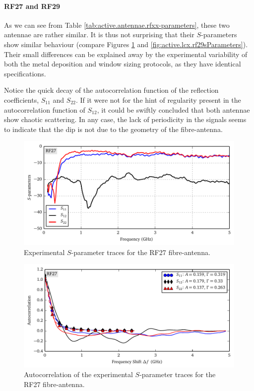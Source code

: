 \paragraph{RF27 and RF29}
As we can see from Table \ref{tab:active.antennae.rfxx-parameters}, these two antennae
are rather similar. It is thus not surprising that their $S$-parameters
show similar behaviour (compare Figures \ref{fig:active.lcx.rf27sParameters} and
\ref{fig:active.lcx.rf29sParameters}). Their small differences can be explained
away by the experimental variability of both the metal deposition and window
sizing protocols, as they have identical specifications.

Notice the quick decay of the autocorrelation function of the reflection 
coefficients, $S_{11}$ and $S_{22}$. If it were not for the hint of
regularity present in the autocorrelation function of $S_{12}$, 
it could be swiftly concluded that both antennae show chaotic scattering.
In any case, the lack of periodicity in the signals seems to indicate 
that the dip is not due to the geometry of the fibre-antenna. 

\begin{figure}
 \centering
 \includegraphics{figs/active/RF27-sParameters.pdf}
 \caption[Experimental $S$-parameter traces for the RF27 fibre-antenna]
 		{Experimental $S$-parameter traces for the RF27 fibre-antenna.}
 \label{fig:active.lcx.rf27sParameters}
\end{figure}

\begin{figure}
 \centering
 \includegraphics{figs/active/RF27-autoCorrelation.pdf}
 \caption[Autocorrelation of the experimental $S$-parameter traces for the RF27 fibre-antenna]
 		{Autocorrelation of the experimental $S$-parameter traces for the RF27 fibre-antenna.}
 \label{fig:active.lcx.rf27autocorrelation}
\end{figure}


